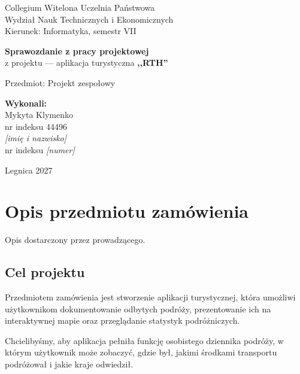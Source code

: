 \documentclass[a4paper,12pt]{article}
\begin{document}
\begin{titlepage}
  \centering

  Collegium Witelona Uczelnia Państwowa\\
  Wydział Nauk Technicznych i Ekonomicznych\\
  Kierunek: Informatyka, semestr VII

  \vspace{4cm}

  {\Large\bfseries Sprawozdanie z pracy projektowej}\\[0.5em]
  z projektu --- aplikacja turystyczna \textbf{,,RTH''}

  \vspace{1cm}

  Przedmiot: Projekt zespołowy

  \vspace{4cm}

  \begin{flushright}
    \textbf{Wykonali:}\\[0.5em]
    Mykyta Klymenko\\
    nr indeksu 44496\\[0.5em]
    \textit{[imię i nazwisko]}\\
    nr indeksu \textit{[numer]}
  \end{flushright}

  \vfill

  Legnica 2027
\end{titlepage}

\tableofcontents
\newpage

\section{Opis przedmiotu zamówienia}

Opis dostarczony przez prowadzącego.

\subsection{Cel projektu}

Przedmiotem zamówienia jest stworzenie aplikacji turystycznej, która umożliwi użytkownikom
dokumentowanie odbytych podróży, prezentowanie ich na interaktywnej mapie oraz przeglądanie
statystyk podróżniczych.

Chcielibyśmy, aby aplikacja pełniła funkcję osobistego dziennika podróży, w którym użytkownik może
zobaczyć, gdzie był, jakimi środkami transportu podróżował i jakie kraje odwiedził.
\end{document}
